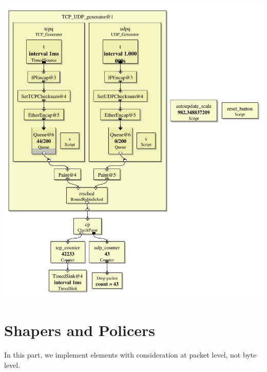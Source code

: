 \documentclass[a4paper]{article}
\begin{document}
    \begin{center}
	  \includegraphics[scale=0.4]{TCP_UDP_generator.pdf}
	  \label{fig:tcpudp}
  \end{center}
  \section{Shapers and Policers}
  In this part, we implement elements with consideration at packet level, not byte level.
\end{document}

